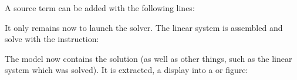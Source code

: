 \documentclass[a4paper,11pt,english]{sphinxmanual}
\begin{document}
\sphinxAtStartPar
A source term can be added with the following lines:

\begin{sphinxVerbatim}[commandchars=\\\{\}]
\end{sphinxVerbatim}

\sphinxAtStartPar
It only remains now to launch the solver. The linear system is assembled and solve
with the instruction:

\begin{sphinxVerbatim}[commandchars=\\\{\}]
\end{sphinxVerbatim}

\sphinxAtStartPar
The model now contains the solution (as well as other things, such as the linear
system which was solved). It is extracted, a display into a  or  figure:
\end{document}
